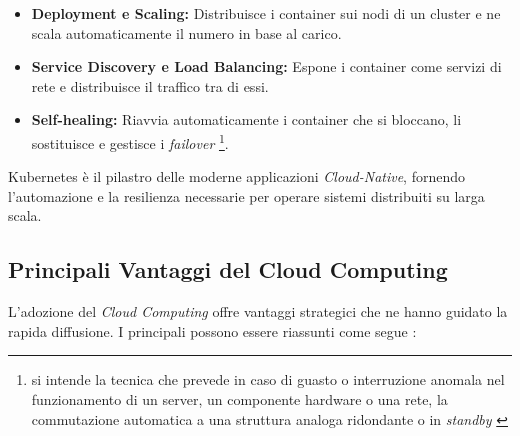 \begin{enumerate}
    \begin{itemize}
        \item \textbf{Deployment e Scaling:} Distribuisce i container sui nodi di un cluster e ne scala automaticamente il numero in base al carico.
        \item \textbf{Service Discovery e Load Balancing:} Espone i container come servizi di rete e distribuisce il traffico tra di essi.
        \item \textbf{Self-healing:} Riavvia automaticamente i container che si bloccano, li sostituisce e gestisce i \textit{failover} \footnote{si intende la tecnica che prevede in caso di guasto o interruzione anomala nel funzionamento di un server, un componente hardware o una rete, la commutazione automatica a una struttura analoga ridondante o in \textit{standby} \cite{wikipedia-failover}}.
    \end{itemize}
\end{enumerate}

Kubernetes è il pilastro delle moderne applicazioni \textit{Cloud-Native}, fornendo l'automazione e la resilienza necessarie per operare sistemi distribuiti su larga scala.



\subsection{Principali Vantaggi del Cloud Computing}



L'adozione del \textit{Cloud Computing} offre vantaggi strategici che ne hanno guidato la rapida diffusione. I principali possono essere riassunti come segue \cite{Azure}:


